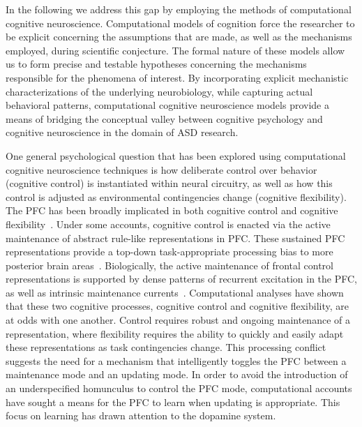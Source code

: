 In the following we address this gap by employing the methods of computational cognitive neuroscience.  Computational models of cognition force the researcher to be explicit concerning the assumptions that are made, as well as the mechanisms employed, during scientific conjecture. The formal nature of these models allow us to form precise and testable hypotheses concerning the mechanisms responsible for the phenomena of interest. By incorporating explicit mechanistic characterizations of the underlying neurobiology, while capturing actual behavioral patterns, computational cognitive neuroscience models provide a means of bridging the conceptual valley between cognitive psychology and cognitive neuroscience in the domain of ASD research.

One general psychological question that has been explored using computational cognitive neuroscience techniques is how deliberate control over behavior (cognitive control) is instantiated within neural circuitry, as well as how this control is adjusted as environmental contingencies change (cognitive flexibility).  The PFC has been broadly implicated in both cognitive control and cognitive flexibility~\cite{Stuss:2000:WCSTLesion,Stuss:2001:StroopLesion}. Under some accounts, cognitive control is enacted via the active maintenance of abstract rule-like representations in PFC.  These sustained PFC representations provide a top-down task-appropriate processing bias to more posterior brain areas~\cite{CohenJD:1990:Stroop}. Biologically, the active maintenance of frontal control representations is supported by dense patterns of recurrent excitation in the PFC, as well as intrinsic maintenance currents~\cite{Goldman-RakicPS:1987:PFC_Maintenance}.  Computational analyses have shown that these two cognitive processes, cognitive control and cognitive flexibility, are at odds with one another.  Control requires robust and ongoing maintenance of a representation, where flexibility requires the ability to quickly and easily adapt these representations as task contingencies change.  This processing conflict suggests the need for a mechanism that intelligently toggles the PFC between a maintenance mode and an updating mode.  In order to avoid the introduction of an underspecified homunculus to control the PFC mode, computational accounts have sought a means for the PFC to learn when updating is appropriate.  This focus on learning has drawn attention to the dopamine system.   

